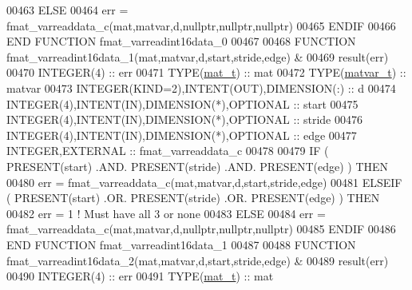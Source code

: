 \begin{DoxyCode}
00463     \textcolor{keywordflow}{ELSE}
00464         err = fmat\_varreaddata\_c(mat,matvar,d,nullptr,nullptr,nullptr)
00465 \textcolor{keywordflow}{    ENDIF}
00466 \textcolor{keyword}{END FUNCTION }fmat\_varreadint16data\_0
00467 
00468 \textcolor{keyword}{FUNCTION }fmat\_varreadint16data\_1(mat,matvar,d,start,stride,edge) &
00469                                                        result(err)
00470     \textcolor{keywordtype}{INTEGER(4)}                                  :: err
00471     \textcolor{keywordtype}{TYPE}(\hyperlink{group___m_a_t_gab0fc888f5a5d79943b16284b1f91c2e8}{mat\_t})                                 :: mat
00472     \textcolor{keywordtype}{TYPE}(\hyperlink{group___m_a_t_structmatvar__t}{matvar\_t})                              :: matvar
00473     \textcolor{keywordtype}{INTEGER(KIND=2)},\textcolor{keywordtype}{INTENT(OUT)},\textcolor{keywordtype}{DIMENSION(:)}    :: d
00474     \textcolor{keywordtype}{INTEGER(4)},\textcolor{keywordtype}{INTENT(IN)},\textcolor{keywordtype}{DIMENSION(*)},\textcolor{keywordtype}{OPTIONAL} :: start
00475     \textcolor{keywordtype}{INTEGER(4)},\textcolor{keywordtype}{INTENT(IN)},\textcolor{keywordtype}{DIMENSION(*)},\textcolor{keywordtype}{OPTIONAL} :: stride
00476     \textcolor{keywordtype}{INTEGER(4)},\textcolor{keywordtype}{INTENT(IN)},\textcolor{keywordtype}{DIMENSION(*)},\textcolor{keywordtype}{OPTIONAL} :: edge
00477     \textcolor{keywordtype}{INTEGER},\textcolor{keywordtype}{EXTERNAL}                            :: fmat\_varreaddata\_c
00478 
00479     \textcolor{keywordflow}{IF} ( \textcolor{keyword}{PRESENT}(start) .AND. \textcolor{keyword}{PRESENT}(stride) .AND. \textcolor{keyword}{PRESENT}(edge) ) \textcolor{keywordflow}{THEN}
00480         err = fmat\_varreaddata\_c(mat,matvar,d,start,stride,edge)
00481     \textcolor{keywordflow}{ELSEIF} ( \textcolor{keyword}{PRESENT}(start) .OR. \textcolor{keyword}{PRESENT}(stride) .OR. \textcolor{keyword}{PRESENT}(edge) ) \textcolor{keywordflow}{THEN}
00482         err = 1    \textcolor{comment}{! Must have all 3 or none}
00483     \textcolor{keywordflow}{ELSE}
00484         err = fmat\_varreaddata\_c(mat,matvar,d,nullptr,nullptr,nullptr)
00485 \textcolor{keywordflow}{    ENDIF}
00486 \textcolor{keyword}{END FUNCTION }fmat\_varreadint16data\_1
00487 
00488 \textcolor{keyword}{FUNCTION }fmat\_varreadint16data\_2(mat,matvar,d,start,stride,edge) &
00489                                                        result(err)
00490     \textcolor{keywordtype}{INTEGER(4)}                                  :: err
00491     \textcolor{keywordtype}{TYPE}(\hyperlink{group___m_a_t_gab0fc888f5a5d79943b16284b1f91c2e8}{mat\_t})                                 :: mat

\end{DoxyCode}
